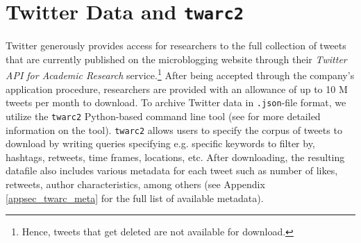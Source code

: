 \section{Twitter Data and \texttt{twarc2}}\label{sec_dat}
    
    
        
        

    Twitter generously provides access for researchers to the full collection of tweets that are currently published on the microblogging website through their {\it Twitter API for Academic Research} service.\footnote{Hence, tweets that get deleted are not available for download.} After being accepted through the company's application procedure, researchers are provided with an allowance of up to 10 M tweets per month to download. To archive Twitter data in \texttt{.json}-file format, we utilize the \texttt{twarc2} Python-based command line tool (see \cite{web_twarc} for more detailed information on the tool). \texttt{twarc2} allows users to specify the corpus of tweets to download by writing queries specifying e.g. specific keywords to filter by, hashtags, retweets, time frames, locations, etc. After downloading, the resulting datafile also includes various metadata for each tweet such as number of likes, retweets, author characteristics, among others (see Appendix \ref{appsec_twarc_meta} for the full list of available metadata). 
        
